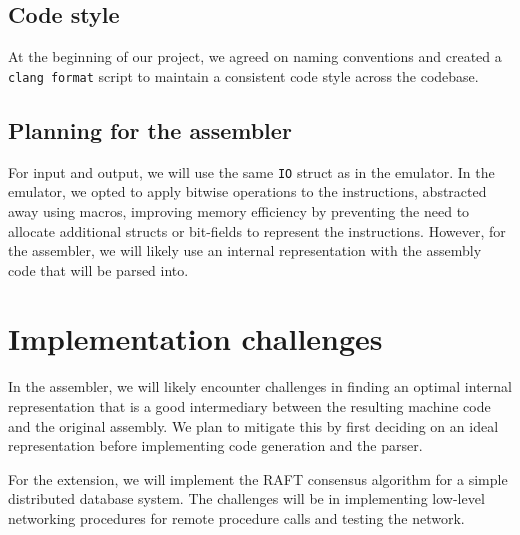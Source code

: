 \documentclass[11pt]{article}
\begin{document}
\subsection{Code style}

At the beginning of our project, we agreed on naming conventions and created a \texttt{clang format} script to maintain a consistent code style across the codebase.

\subsection{Planning for the assembler}

For input and output, we will use the same \texttt{IO} struct as in the emulator. In the emulator, we opted to apply bitwise operations to the instructions, abstracted away using macros, improving memory efficiency by preventing the need to allocate additional structs or bit-fields to represent the instructions. However, for the assembler, we will likely use an internal representation with the assembly code that will be parsed into.

\section{Implementation challenges}

In the assembler, we will likely encounter challenges in finding an optimal internal representation that is a good intermediary between the resulting machine code and the original assembly. We plan to mitigate this by first deciding on an ideal representation before implementing code generation and the parser.

For the extension, we will implement the RAFT consensus algorithm for a simple distributed database system. The challenges will be in implementing low-level networking procedures for remote procedure calls and testing the network.
\end{document}
